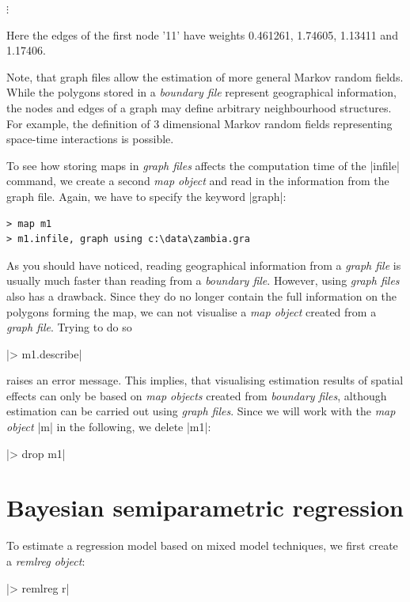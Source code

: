 \documentclass[a4paper]{article}
\begin{document}
\hspace{1cm} $\vdots$

\normalsize

\vspace{0.5cm}

Here the edges of the first node '11' have weights 0.461261,
1.74605, 1.13411 and 1.17406.

Note, that graph files allow the estimation of more general Markov
random fields. While the polygons stored in a {\em boundary file}
represent geographical information, the nodes and edges of a graph
may define arbitrary neighbourhood structures. For example, the
definition of 3 dimensional Markov random fields representing
space-time interactions is possible.

To see how storing maps in {\it graph files} affects the
computation time of the |infile| command, we create a second {\it
map object} and read in the information from the graph file.
Again, we have to specify the keyword |graph|:

\begin{verbatim}
> map m1
> m1.infile, graph using c:\data\zambia.gra
\end{verbatim}

As you should have noticed, reading geographical information from
a {\it graph file} is usually much faster than reading from a {\it
boundary file}. However, using {\it graph files} also has a
drawback. Since they do no longer contain the full information on
the polygons forming the map, we can not visualise a {\it map
object} created from a {\it graph file}. Trying to do so

|> m1.describe|

raises an error message. This implies, that visualising estimation
results of spatial effects can only be based on {\it map objects}
created from {\it boundary files}, although estimation can be
carried out using {\it graph files}. Since we will work with the
{\it map object} |m| in the following, we delete |m1|:

|> drop m1|

\section{Bayesian semiparametric regression}\label{regression}

To estimate a regression model based on mixed model techniques, we
first create a {\it remlreg object}:

|> remlreg r|
\end{document}
